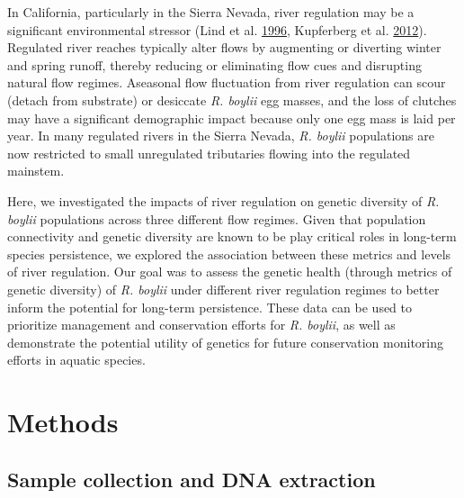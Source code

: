 \documentclass[proquest,12pt,final]{ucthesis-CA2012} %
\begin{document}
\begin{ucmainmatter}
In California, particularly in the Sierra Nevada, river regulation may
be a significant environmental stressor (Lind et al.
\protect\hyperlink{ref-lind_effects_1996}{1996}, Kupferberg et al.
\protect\hyperlink{ref-kupferberg_effects_2012}{2012}). Regulated river
reaches typically alter flows by augmenting or diverting winter and
spring runoff, thereby reducing or eliminating flow cues and disrupting
natural flow regimes. Aseasonal flow fluctuation from river regulation
can scour (detach from substrate) or desiccate \emph{R. boylii} egg
masses, and the loss of clutches may have a significant demographic
impact because only one egg mass is laid per year. In many regulated
rivers in the Sierra Nevada, \emph{R. boylii} populations are now
restricted to small unregulated tributaries flowing into the regulated
mainstem.

\par

Here, we investigated the impacts of river regulation on genetic
diversity of \emph{R. boylii} populations across three different flow
regimes. Given that population connectivity and genetic diversity are
known to be play critical roles in long-term species persistence, we
explored the association between these metrics and levels of river
regulation. Our goal was to assess the genetic health (through metrics
of genetic diversity) of \emph{R. boylii} under different river
regulation regimes to better inform the potential for long-term
persistence. These data can be used to prioritize management and
conservation efforts for \emph{R. boylii}, as well as demonstrate the
potential utility of genetics for future conservation monitoring efforts
in aquatic species.

\hypertarget{methods}{%
\section{Methods}\label{methods}}

\hypertarget{ch1samplecollection}{%
\subsection{Sample collection and DNA
extraction}\label{ch1samplecollection}}


\end{ucmainmatter}
\end{document}

